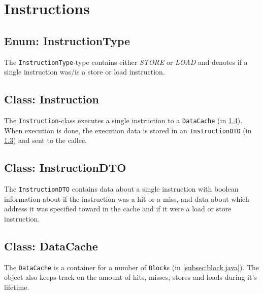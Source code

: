 \documentclass[a4paper]{scrreprt}
\begin{document}


\section{Instructions}

\subsection{Enum: InstructionType}
\label{subsec:instructiontype.java}

The \texttt{InstructionType}-type contains either \textit{STORE} or \textit{LOAD} and denotes if a single instruction was/is a store or load instruction.



\subsection{Class: Instruction}
\label{subsec:instruction.java}

The \texttt{Instruction}-class executes a single instruction to a \texttt{DataCache} (in \ref{subsec:datacache.java}). When execution is done, the execution data is stored in an \texttt{InstructionDTO} (in \ref{subsec:instructiondto.java}) and sent to the callee.



\subsection{Class: InstructionDTO}
\label{subsec:instructiondto.java}

The \texttt{InstructionDTO} contains data about a single instruction with boolean information about if the instruction was a hit or a miss, and data about which address it was specified toward in the cache and if it were a load or store instruction.



\subsection{Class: DataCache}
\label{subsec:datacache.java}

The \texttt{DataCache} is a container for a number of \texttt{Block}s (in \ref{subsec:block.java}). The object also keeps track on the amount of hits, misses, stores and loads during it's lifetime.
\end{document}

